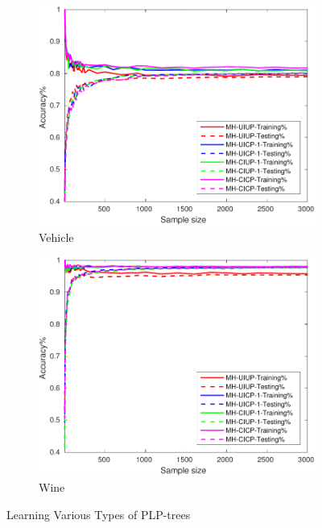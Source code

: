 \begin{figure}[ht]
\begin{subfigure}[b]{0.3\textwidth}
  	\includegraphics[width=\textwidth]{figs/PLPTF/Trees/VehicleDownsampledFurther_Trees_MH.pdf}
  	\caption{Vehicle}
		\label{fig:V2}
	\end{subfigure}
  \begin{subfigure}[b]{0.3\textwidth}
		\centering
  	\includegraphics[width=\textwidth]{figs/PLPTF/Trees/WineDownsampled_Trees_MH.pdf}
  	\caption{Wine}
		\label{fig:W2}
	\end{subfigure}

  \caption{Learning Various Types of PLP-trees}
  \label{fig:trees2}
\end{figure}

